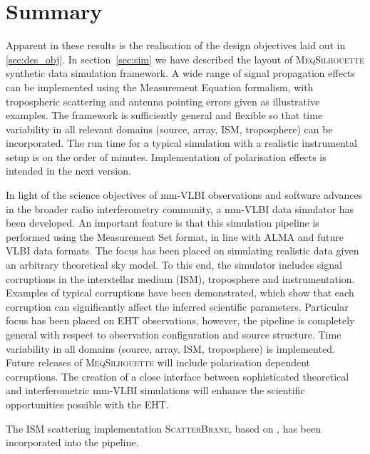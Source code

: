 \section{Summary}

Apparent in these results is the realisation of the design objectives laid out in \ref{sec:des_obj}.
In section~\ref{sec:sim} we have described the layout of \textsc{MeqSilhouette} synthetic data simulation framework. A wide range of signal propagation effects can be implemented using the Measurement Equation formalism, with tropospheric scattering and antenna pointing errors given as illustrative examples. The framework is sufficiently general and flexible so that time variability in all relevant domains (source, array, ISM, troposphere) can be incorporated. The run time for a typical simulation with a realistic instrumental setup is on the order of minutes.  Implementation of polarisation effects is intended in the next version. 

In light of the science objectives of mm-VLBI observations and software advances in the broader radio interferometry community, a mm-VLBI data simulator has been developed. An important feature is that this simulation pipeline is performed using the {\sc Measurement Set} format, in line with ALMA and future VLBI data formats. The focus has been placed on simulating realistic data given an arbitrary theoretical sky model. To this end, the simulator includes signal corruptions in the interstellar medium (ISM), troposphere and instrumentation. Examples of typical corruptions have been demonstrated, which show that each corruption can significantly affect the inferred scientific parameters. Particular focus has been placed on EHT observations, however, the pipeline is completely general with respect to observation configuration and source structure. Time variability in all domains (source, array, ISM, troposphere) is implemented.  Future releases of \textsc{MeqSilhouette} will include polarisation dependent corruptions. The creation of a close interface between sophisticated theoretical and interferometric mm-VLBI simulations will enhance the scientific opportunities possible with the EHT.

The ISM scattering implementation \textsc{ScatterBrane}, based on \citet*{Johnson_2015a}, has been incorporated into the pipeline.


